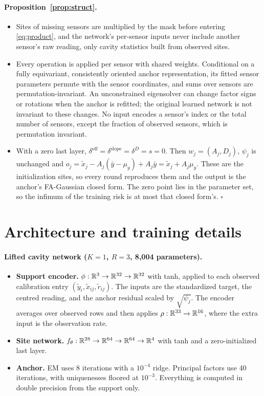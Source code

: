 \paragraph{Proposition~\ref{prop:struct}.}
\begin{itemize}
  \item[(i)] Sites of missing sensors are multiplied by the mask before entering \eqref{eq:product}, and the
  network's per-sensor inputs never include another sensor's raw reading, only cavity statistics built from observed
  sites.
  \item[(ii)] Every operation is applied per sensor with shared weights. Conditional on a fully equivariant, consistently oriented anchor
  representation, its fitted sensor parameters permute with the sensor coordinates, and sums over sensors are
  permutation-invariant. An unconstrained eigensolver can change factor signs or rotations when the anchor is
  refitted; the original learned network is not invariant to these changes. No input encodes a
  sensor's index or the total number of sensors, except the fraction of observed sensors, which is permutation
  invariant.
  \item[(iii)] With a zero last layer, $\delta^{\mathrm{off}}=\delta^{\mathrm{slope}}=\delta^D=s=0$. Then
  $w_j=(A_j,D_j)$, $\psi_j$ is unchanged and $o_j=\tilde x_j-A_j(\bar y-\mu_y)+A_j\bar y=\tilde x_j+A_j\mu_y$. These
  are the initialization sites, so every round reproduces them and the output is the anchor's FA-Gaussian closed form. The zero point lies
  in the parameter set, so the infimum of the training risk is at most that closed form's. \hfill$\square$
\end{itemize}

\section{Architecture and training details}
\label{app:arch}

\paragraph{Lifted cavity network ($K=1$, $R=3$, 8{,}004 parameters).}
\begin{itemize}
  \item \textbf{Support encoder.} $\phi:\mathbb{R}^3\to\mathbb{R}^{32}\to\mathbb{R}^{32}$ with tanh, applied to each observed calibration
  entry $(\tilde y_i,\tilde x_{ij},\tilde r_{ij})$. The inputs are the standardized target, the centred reading, and
  the anchor residual scaled by $\sqrt{\psi_j}$. The encoder averages over observed rows and then applies
  $\rho:\mathbb{R}^{33}\to\mathbb{R}^{16}$, where the extra input is the observation rate.
  \item \textbf{Site network.} $f_\theta:\mathbb{R}^{28}\to\mathbb{R}^{64}\to\mathbb{R}^{64}\to\mathbb{R}^{4}$ with tanh and a zero-initialized
  last layer.
  \item \textbf{Anchor.} EM uses 8 iterations with a $10^{-4}$ ridge. Principal factors use 40 iterations, with
  uniquenesses floored at $10^{-3}$. Everything is computed in double precision from the support only.
\end{itemize}

